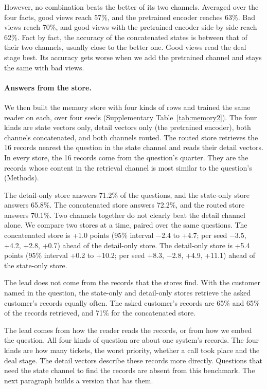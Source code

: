 \documentclass[11pt]{article}
\begin{document}
However, no combination beats the better of its two channels. Averaged over the four facts, good views reach 57\%, and the pretrained encoder reaches 63\%. Bad views reach 70\%, and good views with the pretrained encoder side by side reach 62\%. Fact by fact, the accuracy of the concatenated states is between that of their two channels, usually close to the better one. Good views read the deal stage best. Its accuracy gets worse when we add the pretrained channel and stays the same with bad views.

\paragraph{Answers from the store.} We then built the memory store with four kinds of rows and trained the same reader on each, over four seeds (Supplementary Table~\ref{tab:memory2}). The four kinds are state vectors only, detail vectors only (the pretrained encoder), both channels concatenated, and both channels routed. The routed store retrieves the 16 records nearest the question in the state channel and reads their detail vectors. In every store, the 16 records come from the question's quarter. They are the records whose content in the retrieval channel is most similar to the question's (Methods).

The detail-only store answers 71.2\% of the questions, and the state-only store answers 65.8\%. The concatenated store answers 72.2\%, and the routed store answers 70.1\%. Two channels together do not clearly beat the detail channel alone. We compare two stores at a time, paired over the same questions. The concatenated store is +1.0 points (95\% interval $-$2.4 to +4.7; per seed $-$3.5, +4.2, +2.8, +0.7) ahead of the detail-only store. The detail-only store is +5.4 points (95\% interval +0.2 to +10.2; per seed +8.3, $-$2.8, +4.9, +11.1) ahead of the state-only store.

The lead does not come from the records that the stores find. With the customer named in the question, the state-only and detail-only stores retrieve the asked customer's records equally often. The asked customer's records are 65\% and 65\% of the records retrieved, and 71\% for the concatenated store.

The lead comes from how the reader reads the records, or from how we embed the question. All four kinds of question are about one system's records. The four kinds are how many tickets, the worst priority, whether a call took place and the deal stage. The detail vectors describe these records more directly. Questions that need the state channel to find the records are absent from this benchmark. The next paragraph builds a version that has them.
\end{document}
